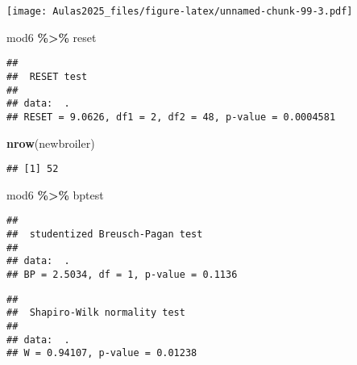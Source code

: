 \documentclass[
]{book}
\newenvironment{Shaded}{\begin{snugshade}}{\end{snugshade}}
\newcommand{\AttributeTok}[1]{\textcolor[rgb]{0.13,0.29,0.53}{#1}}
\newcommand{\DecValTok}[1]{\textcolor[rgb]{0.00,0.00,0.81}{#1}}
\newcommand{\FunctionTok}[1]{\textcolor[rgb]{0.13,0.29,0.53}{\textbf{#1}}}
\newcommand{\NormalTok}[1]{#1}
\newcommand{\OtherTok}[1]{\textcolor[rgb]{0.56,0.35,0.01}{#1}}
\newcommand{\SpecialCharTok}[1]{\textcolor[rgb]{0.81,0.36,0.00}{\textbf{#1}}}
\begin{document}
\texttt{[image: Aulas2025\_files/figure-latex/unnamed-chunk-99-3.pdf]}

\begin{Shaded}
\begin{Highlighting}[]
\NormalTok{mod6 }\SpecialCharTok{\%\textgreater{}\%}
\NormalTok{    reset}
\end{Highlighting}
\end{Shaded}

\begin{verbatim}
## 
##  RESET test
## 
## data:  .
## RESET = 9.0626, df1 = 2, df2 = 48, p-value = 0.0004581
\end{verbatim}

\begin{Shaded}
\begin{Highlighting}[]
\FunctionTok{nrow}\NormalTok{(newbroiler)}
\end{Highlighting}
\end{Shaded}

\begin{verbatim}
## [1] 52
\end{verbatim}

\begin{Shaded}
\begin{Highlighting}[]
\NormalTok{mod6 }\SpecialCharTok{\%\textgreater{}\%}
\NormalTok{    bptest}
\end{Highlighting}
\end{Shaded}

\begin{verbatim}
## 
##  studentized Breusch-Pagan test
## 
## data:  .
## BP = 2.5034, df = 1, p-value = 0.1136
\end{verbatim}

\begin{Shaded}
\end{Shaded}

\begin{verbatim}
## 
##  Shapiro-Wilk normality test
## 
## data:  .
## W = 0.94107, p-value = 0.01238
\end{verbatim}
\end{document}
